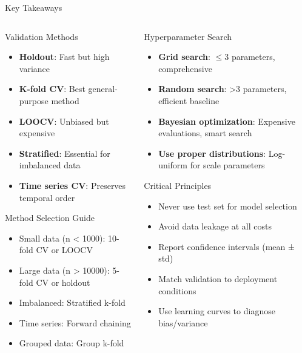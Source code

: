 \documentclass[8pt,aspectratio=1610]{beamer}
\begin{document}
\begin{frame}{Key Takeaways}
\begin{columns}[t]
\begin{column}{0.48\textwidth}
\begin{block}{Validation Methods}
\begin{itemize}
\setlength{\itemsep}{3pt}
\item \textbf{Holdout}: Fast but high variance
\item \textbf{K-fold CV}: Best general-purpose method
\item \textbf{LOOCV}: Unbiased but expensive
\item \textbf{Stratified}: Essential for imbalanced data
\item \textbf{Time series CV}: Preserves temporal order
\end{itemize}
\end{block}

\begin{block}{Method Selection Guide}
\begin{itemize}
\setlength{\itemsep}{2pt}
\item Small data (n < 1000): 10-fold CV or LOOCV
\item Large data (n > 10000): 5-fold CV or holdout
\item Imbalanced: Stratified k-fold
\item Time series: Forward chaining
\item Grouped data: Group k-fold
\end{itemize}
\end{block}
\end{column}

\begin{column}{0.48\textwidth}
\begin{block}{Hyperparameter Search}
\begin{itemize}
\setlength{\itemsep}{3pt}
\item \textbf{Grid search}: $\leq$3 parameters, comprehensive
\item \textbf{Random search}: >3 parameters, efficient baseline
\item \textbf{Bayesian optimization}: Expensive evaluations, smart search
\item \textbf{Use proper distributions}: Log-uniform for scale parameters
\end{itemize}
\end{block}

\begin{block}{Critical Principles}
\begin{itemize}
\setlength{\itemsep}{2pt}
\item Never use test set for model selection
\item Avoid data leakage at all costs
\item Report confidence intervals (mean ± std)
\item Match validation to deployment conditions
\item Use learning curves to diagnose bias/variance
\end{itemize}
\end{block}
\end{column}
\end{columns}


\end{frame}
\end{document}
